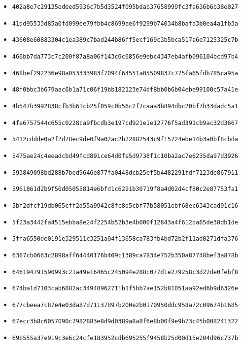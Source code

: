 {\begin{itemize}
    \item \texttt{402a8e7c29135edeed5936c7b5d3524f095bdab37658999fc3fa636b6b38e027}
    \item \texttt{41dd95533d85a0fd099ee79fbb4c8699ae6f9299b74034b8bafa3b0ea4a1fb3a}
    \item \texttt{43608e60883304c1ea389c7bad244b86ff5ecf169c3b5bca517a6e7125325c7b}
    \item \texttt{466bb7da773c7c200f87a8a06f143c6c6856e9ebc4347eb4afb096104bcd97b4}
    \item \texttt{468bef292236e98a053333983f7094f64551a05509837c775fa65fdb785ca95a}
    \item \texttt{48f0bbc3b679aac6b1a71c06f19bb182123e74df8bb0b6b04ebe99100c57a41e}
    \item \texttt{4b547b3992838cfb3b61cb25f059c0b56c2f7caaa3b894dbc20bf7b33dadc5a1}
    \item \texttt{4fe6757544c655c0228ca9fbcdb3e197cd921e1e12776f5ad391cb9ac32d3667}
    \item \texttt{5412cddde0a2f2d78ec9de0f9a02ac2b22882543c9f15724ebe14b3a0bf8cbda}
    \item \texttt{5475ae24c4eeadcbd49fcd891ce64d0fe5d9738f1c10ba2ac7e6235da97d3926}
    \item \texttt{593849098bd288b7bed9646e877fa0448dcb25ef5b4482291fdf7123de867911}
    \item \texttt{5961861d2b9f50d05055814e6bfd1c6291b30719f8a4d02d4cf80c2e87753fa1}
    \item \texttt{5bf2dfcf19db065cff2d55a9942c8fc8d5cbf77b58051ebf68ec6343cad91c16}
    \item \texttt{5f23a3442fa4515ebba8e24f2254b52b3e4b000f12843a4f612da65de38db1de}
    \item \texttt{5ffa6550de0191e329511c3251a04f13658ca783fb4bd72b2f11ad0271dfa376}
    \item \texttt{6367cb0663c2898aff64440176b409c1389ca7834e752b350a87748bef3a878b}
    \item \texttt{646194791590993c21a49e16465c245094e288c077d1e279258c3d22de0febf8}
    \item \texttt{674ba1d7103cab6082ac34940962711b1f5bb7ae152b81051aa92ed6b9d6326e}
    \item \texttt{677cbeea7c87e4e03da87d71137897b200e2b0170950ddc958a72c09674b1685}
    \item \texttt{67ecc3b8c6057090c7982883e8d9d0389a8a8f6e8b00f9e9b73c45b008241322}
    \item \texttt{69b555a37e919c3e6c24cfe183952cdb695255f9458b25d00d15e204d96c737b}

\end{itemize}}
